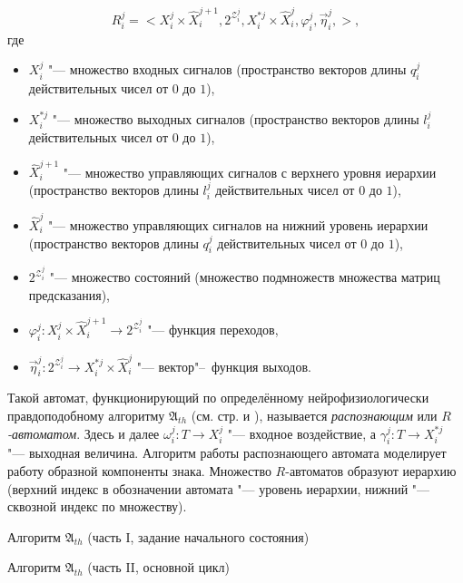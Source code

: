 \[
R_i^j=<X_i^j\times \hat{X}_i^{j+1}, 2^{\mathcal Z_i^j}, X_i^{*j}\times \hat{X}_i^j,\varphi_i^j,\vec\eta_i^j,>,
\]
где
\begin{itemize}
	\item $X_i^j$ "--- множество входных сигналов (пространство векторов длины $q_i^j$ действительных чисел от $0$ до $1$), 
	\item $X_i^{*j}$ "--- множество выходных сигналов (пространство векторов длины $l_i^j$ действительных чисел от $0$ до $1$), 
	\item $\hat{X}_i^{j+1}$ "--- множество управляющих сигналов с верхнего уровня иерархии (пространство векторов длины $l_i^j$ действительных чисел от $0$ до $1$),
	\item $\hat{X}_i^j$ "--- множество управляющих сигналов на нижний уровень иерархии (пространство векторов длины $q_i^j$ действительных чисел от $0$ до $1$),
	\item $2^{\mathcal Z_i^j}$ "--- множество состояний (множество подмножеств множества матриц предсказания),
	\item $\varphi_i^j:X_i^j\times \hat{X}_i^{j+1}\to 2^{\mathcal Z_i^j}$ "--- функция переходов,
	\item $\vec\eta_i^j:2^{\mathcal Z_i^j} \to X_i^{*j}\times \hat{X}_i^j$ "--- вектор"--~функция выходов.
\end{itemize}
Такой автомат, функционирующий по определённому нейрофизиологически правдоподобному алгоритму $\mathfrak A_{th}$ (см. стр. \pageref{alg:th_init} и \pageref{alg:th_cycle}), называется \textit{распознающим} или\textit{ $R$-автоматом}. Здесь и далее $\omega_i^j:T{\to}X_i^j$ "--- входное воздействие, а $\gamma_i^j:T{\to}X_i^{*j}$ "--- выходная величина. Алгоритм работы распознающего автомата моделирует работу образной компоненты знака. Множество $R$-автоматов образуют иерархию (верхний индекс в обозначении автомата "--- уровень иерархии, нижний "--- сквозной индекс по множеству).

\begin{algorithm}[h]
	\caption{Алгоритм $\mathfrak{A}_{th}$ (часть I, задание начального состояния)}\label{alg:th_init}
	\begin{algorithmic}[1]
		
	\end{algorithmic}
\end{algorithm}

\begin{algorithm}[h]
	\caption{Алгоритм $\mathfrak{A}_{th}$ (часть II, основной цикл)}\label{alg:th_cycle}
	\begin{algorithmic}[1]
		\algrestore{algst:store1}
		
	\end{algorithmic}
\end{algorithm}

